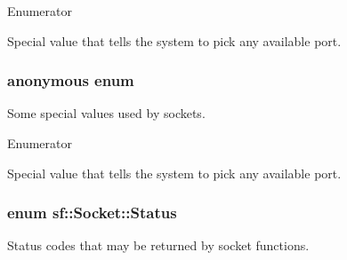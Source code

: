 \begin{Desc}
\item[Enumerator]\par
\begin{description}
\item[{\em 
\hypertarget{classsf_1_1_socket_a9fd5408593f9e3a357c339739cc77946adee98ca77e6cde0b3d818eb1341e3db0}{Any\-Port}\label{classsf_1_1_socket_a9fd5408593f9e3a357c339739cc77946adee98ca77e6cde0b3d818eb1341e3db0}
}]Special value that tells the system to pick any available port. \end{description}
\end{Desc}
\hypertarget{classsf_1_1_socket_abb4e700721a43ecd95a5acd86344d5e3}{\subsubsection[{anonymous enum}]{\setlength{\rightskip}{0pt plus 5cm}anonymous enum}}\label{classsf_1_1_socket_abb4e700721a43ecd95a5acd86344d5e3}


Some special values used by sockets. 

\begin{Desc}
\item[Enumerator]\par
\begin{description}
\item[{\em 
\hypertarget{classsf_1_1_socket_a9fd5408593f9e3a357c339739cc77946adee98ca77e6cde0b3d818eb1341e3db0}{Any\-Port}\label{classsf_1_1_socket_a9fd5408593f9e3a357c339739cc77946adee98ca77e6cde0b3d818eb1341e3db0}
}]Special value that tells the system to pick any available port. \end{description}
\end{Desc}
\hypertarget{classsf_1_1_socket_a51bf0fd51057b98a10fbb866246176dc}{
\subsubsection[{Status}]{\setlength{\rightskip}{0pt plus 5cm}enum {\bf sf\-::\-Socket\-::\-Status}}}\label{classsf_1_1_socket_a51bf0fd51057b98a10fbb866246176dc}


Status codes that may be returned by socket functions. 

